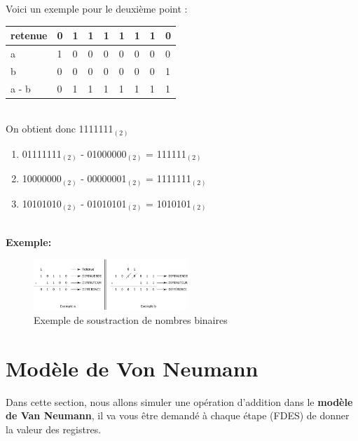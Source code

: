 \begin{Exercice}[15 minutes]
\begin{solution}
Voici un exemple pour le deuxième point : \\
\begin{tabular}{| p{1cm} | p{1cm} | p{1cm} | p{1cm} | p{1cm} | p{1cm} | p{1cm} | p{1cm} | p{1cm} |} 
    \hline
retenue & 0 & 1 & 1 & 1 & 1 & 1 & 1 & 0 \\ [0.5ex]
\hline
    a & 1 & 0 & 0 & 0 & 0 & 0 & 0 & 0 \\ [0.5ex] 
    \hline
    b & 0 & 0 & 0 & 0 & 0 & 0 & 0 & 1 \\ [0.5ex] 
    \hline
    a - b & 0 & 1 & 1 & 1 & 1 & 1 & 1 & 1 \\ [0.5ex]
    \hline
\end{tabular} \\
On obtient donc 1111111$_{(2)}$ \\
 		
 		\begin{enumerate}
        \item 01111111$_{(2)}$ - 01000000$_{(2)}$ = 111111$_{(2)}$
        \item 10000000$_{(2)}$ - 00000001$_{(2)}$ = 1111111$_{(2)}$
        \item 10101010$_{(2)}$ - 01010101$_{(2)}$ = 1010101$_{(2)}$
    \end{enumerate}
    \end{solution}

    \textbf{\\ \faTerminal  Exemple:}
        \begin{figure}[h]
            \centering
            \includegraphics[width=0.52\textwidth]{img/substract.png}
            \caption{Exemple de soustraction de nombres binaires}
        \end{figure}

\end{Exercice}
\newpage
\section{Modèle de Von Neumann}
Dans cette section, nous allons simuler une opération d'addition dans le \textbf{modèle de Van Neumann}, il va vous être demandé à chaque étape (FDES) de donner la valeur des registres.\\

